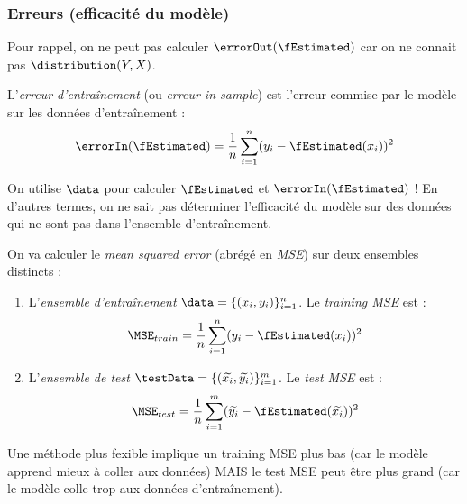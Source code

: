     \subsubsection{Erreurs (efficacité du modèle)}
        Pour rappel, on ne peut pas calculer \(\errorOut(\fEstimated)\) car on ne connait pas \(\distribution(Y, X)\).

        \begin{definition}
            L'\textit{erreur d'entraînement} (ou \textit{erreur in-sample}) est l'erreur commise par le modèle sur les données d'entraînement :
            \[
                \errorIn(\fEstimated) = \frac{1}{n} \sum_{i=1}^n (y_i - \fEstimated(x_i))^2
            \]
        \end{definition}

        \begin{remarque}
            On utilise \(\data\) pour calculer \(\fEstimated\) et \(\errorIn(\fEstimated)\) ! En d'autres termes, on ne sait pas déterminer l'efficacité du modèle sur des données qui ne sont pas dans l'ensemble d'entraînement.
        \end{remarque}

        On va calculer le \textit{mean squared error} (abrégé en \textit{MSE})  sur deux ensembles distincts :
        \begin{enumerate}
            \item L'\textit{ensemble d'entraînement} \(\data = \{(x_i, y_i)\}_{i=1}^n\). Le \textit{training MSE} est :
            \[
                \MSE_{train} = \frac{1}{n} \sum_{i=1}^n (y_i - \fEstimated(x_i))^2
            \]
            \item L'\textit{ensemble de test} \(\testData = \{(\widetilde{x_i}, \widetilde{y_i})\}_{i=1}^m\). Le \textit{test MSE} est :
            \[
                \MSE_{test} = \frac{1}{n} \sum_{i=1}^m (\widetilde{y_i} - \fEstimated(\widetilde{x_i}))^2
            \]
        \end{enumerate}

        Une méthode plus fexible implique un training MSE plus bas (car le modèle apprend mieux à coller aux données) MAIS le test MSE peut être plus grand (car le modèle colle trop aux données d'entraînement).

